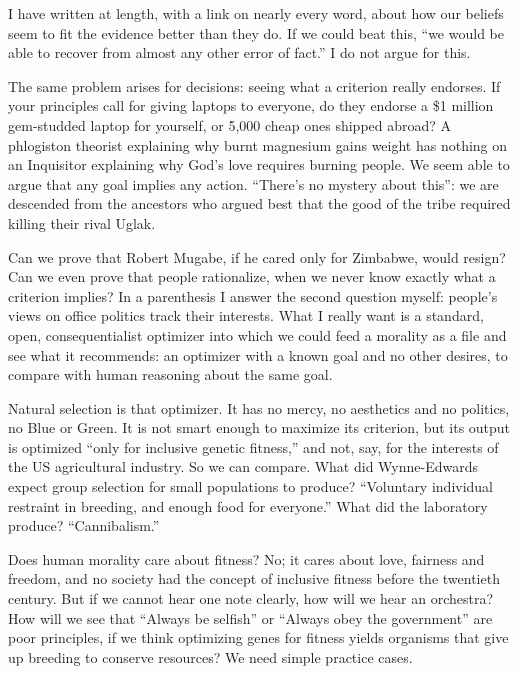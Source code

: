 
I have written at length, with a link on nearly every word, about how our beliefs seem to fit the evidence better than they do. If we could beat this, ``we would be able to recover from almost any other error of fact.'' I do not argue for this.

The same problem arises for decisions: seeing what a criterion really endorses. If your principles call for giving laptops to everyone, do they endorse a \$1 million gem-studded laptop for yourself, or 5,000 cheap ones shipped abroad? A phlogiston theorist explaining why burnt magnesium gains weight has nothing on an Inquisitor explaining why God's love requires burning people. We seem able to argue that any goal implies any action. ``There's no mystery about this'': we are descended from the ancestors who argued best that the good of the tribe required killing their rival Uglak. 

Can we prove that Robert Mugabe, if he cared only for Zimbabwe, would resign? Can we even prove that people rationalize, when we never know exactly what a criterion implies? In a parenthesis I answer the second question myself: people's views on office politics track their interests. What I really want is a standard, open, consequentialist optimizer into which we could feed a morality as a file and see what it recommends: an optimizer with a known goal and no other desires, to compare with human reasoning about the same goal.

Natural selection is that optimizer. It has no mercy, no aesthetics and no politics, no Blue or Green. It is not smart enough to maximize its criterion, but its output is optimized ``only for inclusive genetic fitness,'' and not, say, for the interests of the US agricultural industry. So we can compare. What did Wynne-Edwards expect group selection for small populations to produce? ``Voluntary individual restraint in breeding, and enough food for everyone.'' What did the laboratory produce? ``Cannibalism.'' 

Does human morality care about fitness? No; it cares about love, fairness and freedom, and no society had the concept of inclusive fitness before the twentieth century. But if we cannot hear one note clearly, how will we hear an orchestra? How will we see that ``Always be selfish'' or ``Always obey the government'' are poor principles, if we think optimizing genes for fitness yields organisms that give up breeding to conserve resources? We need simple practice cases. 
